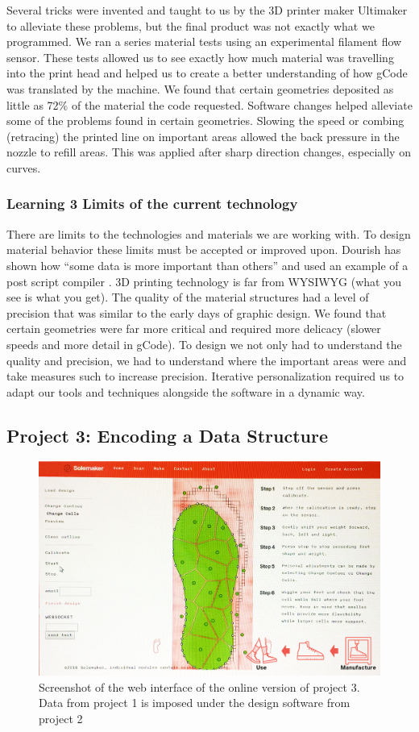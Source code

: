 Several tricks were invented and taught to us by the 3D printer maker Ultimaker to alleviate these problems, but the final product was not exactly what we programmed. We ran a series material tests using an experimental filament flow sensor. These tests allowed us to see exactly how much material was travelling into the print head and helped us to create a better understanding of how gCode was translated by the machine. We found that certain geometries deposited as little as 72\% of the material the code requested. Software changes helped alleviate some of the problems found in certain geometries. Slowing the speed or combing (retracing) the printed line on important areas allowed the back pressure in the nozzle to refill areas. This was applied after sharp direction changes, especially on curves.

\subsubsection{Learning 3 Limits of the current technology}

There are limits to the technologies and materials we are working with. To design material behavior these limits must be accepted or improved upon. Dourish has shown how ``some data is more important than others'' and used an example of a post script compiler \cite{Dourish2017}. 3D printing technology is far from WYSIWYG (what you see is what you get). The quality of the material structures had a level of precision that was similar to the early days of graphic design. We found that certain geometries were far more critical and required more delicacy (slower speeds and more detail in gCode). To design we not only had to understand the quality and precision, we had to understand where the important areas were and take measures such to increase precision. Iterative personalization required us to adapt our tools and techniques alongside the software in a dynamic way. 

\subsection{Project 3: Encoding a Data Structure}

\begin{figure}
\includegraphics[width=.5\textwidth]{Solemaker_io}
\caption{Screenshot of the web interface of the online version of project 3. Data from project 1 is imposed under the design software from project 2 }
\label{fig:Project3}
\end{figure}

